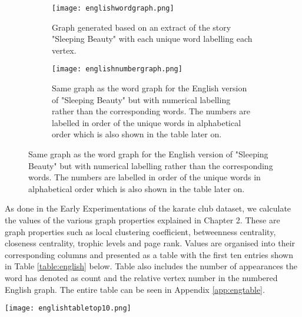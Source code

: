 \begin{figure}[H]
\centering
\begin{subfigure}{.45\textwidth}
	\texttt{[image: englishwordgraph.png]}
	\caption{Graph generated based on an extract of the story "Sleeping Beauty" with each unique word labelling each vertex.}
	\label{fig:engword}
\end{subfigure}
\hfill
\begin{subfigure}{.45\textwidth}
	\texttt{[image: englishnumbergraph.png]}
	\caption{Same graph as the word graph for the English version of "Sleeping Beauty" but with numerical labelling rather than the corresponding words. The numbers are labelled in order of the unique words in alphabetical order which is also shown in the table later on.}
	\label{fig:engnum}
\end{subfigure}
\end{figure}

As done in the Early Experimentations of the karate club dataset, we calculate the values of the various graph properties explained in Chapter 2. These are graph properties such as local clustering coefficient, betweenness centrality, closeness centrality, trophic levels and page rank. Values are organised into their corresponding columns and presented as a table with the first ten entries shown in Table \ref{table:english}  below. Table also includes the number of appearances the word has denoted as count and the relative vertex number in the numbered English graph. The entire table can be seen in Appendix \ref{app:engtable}.

\begin{table}[H]
	\centering
	\texttt{[image: englishtabletop10.png]}
	\caption{First ten entries of the dataset generated for the english version of "Sleeping Beauty" in a table format. }
	\label{table:english}
\end{table}


